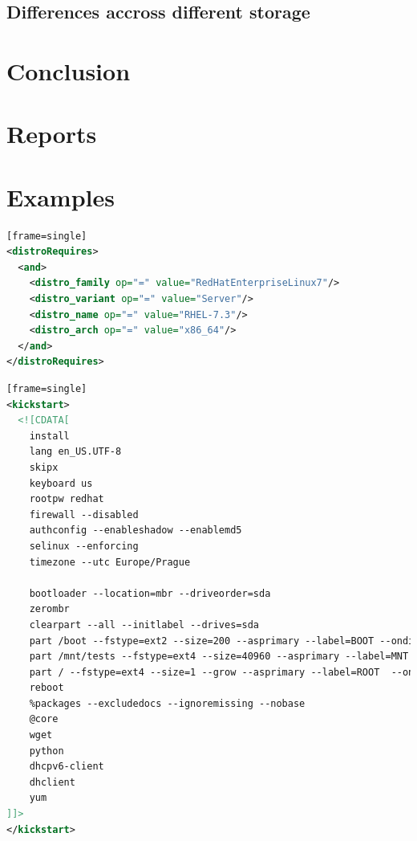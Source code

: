 \documentclass[
  color, %
  table, %
  lof,   %
  lot,   %
]{fithesis3}
\begin{document}
\section{Differences accross different storage}

\chapter{Conclusion}


\printbibliography

\appendix %
\chapter{Reports}
\chapter{Examples}


\begin{lstlisting}[language=xml, caption={Specifying OS to be installed}][frame=single]
<distroRequires>
  <and>
    <distro_family op="=" value="RedHatEnterpriseLinux7"/>
    <distro_variant op="=" value="Server"/>
    <distro_name op="=" value="RHEL-7.3"/>
    <distro_arch op="=" value="x86_64"/>
  </and>
</distroRequires>
\end{lstlisting}

\begin{lstlisting}[language=xml, caption={Configuring environment using kickstart}][frame=single]
<kickstart>
  <![CDATA[
    install
    lang en_US.UTF-8
    skipx
    keyboard us
    rootpw redhat
    firewall --disabled
    authconfig --enableshadow --enablemd5
    selinux --enforcing
    timezone --utc Europe/Prague

    bootloader --location=mbr --driveorder=sda
    zerombr
    clearpart --all --initlabel --drives=sda
    part /boot --fstype=ext2 --size=200 --asprimary --label=BOOT --ondisk=sda
    part /mnt/tests --fstype=ext4 --size=40960 --asprimary --label=MNT --ondisk=sda
    part / --fstype=ext4 --size=1 --grow --asprimary --label=ROOT  --ondisk=sda
    reboot
    %packages --excludedocs --ignoremissing --nobase
    @core
    wget
    python
    dhcpv6-client
    dhclient
    yum
]]>
</kickstart>
\end{lstlisting}
\end{document}
